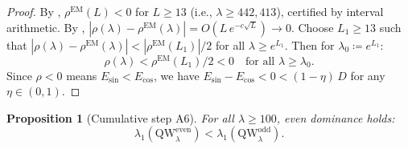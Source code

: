 \documentclass[12pt,a4paper]{article}
\newtheorem{proposition}[theorem]{Proposition}
\theoremstyle{definition}
\theoremstyle{remark}
\begin{document}
\begin{proof}
By , $\rho^{\mathrm{EM}}(L) < 0$ for $L \geq 13$ (i.e., $\lambda \geq 442{,}413$), certified by interval arithmetic. By , $|\rho(\lambda) - \rho^{\mathrm{EM}}(\lambda)| = O(L\,e^{-c\sqrt{L}}) \to 0$. Choose $L_1 \geq 13$ such that $|\rho(\lambda) - \rho^{\mathrm{EM}}(\lambda)| < |\rho^{\mathrm{EM}}(L_1)|/2$ for all $\lambda \geq e^{L_1}$. Then for $\lambda_0 \coloneqq e^{L_1}$:
\[
  \rho(\lambda) < \rho^{\mathrm{EM}}(L_1)/2 < 0 \quad\text{for all } \lambda \geq \lambda_0.
\]
Since $\rho < 0$ means $E_{\sin} < E_{\cos}$, we have $E_{\sin} - E_{\cos} < 0 < (1-\eta)\,D$ for any $\eta \in (0,1)$.
\end{proof}

\begin{proposition}[Cumulative step A6]
\label{prop:A6}
For all $\lambda \geq 100$, even dominance holds:
\[
  \lambda_1(\mathrm{QW}_\lambda^{\mathrm{even}}) < \lambda_1(\mathrm{QW}_\lambda^{\mathrm{odd}}).
\]
\end{proposition}
\end{document}
